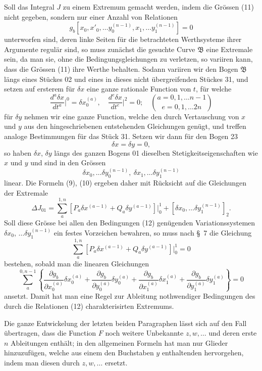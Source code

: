 \documentclass[11pt,a4paper,leqno]{article}
\begin{document}
Soll das Integral $J$ zu einem Extremum gemacht werden, indem die Grössen (11) nicht gegeben, sondern nur einer Anzahl von Relationen
\begin{equation}\tag{12}
g_b[x_0,x'_0,\ldots y_0^{(n-1)},x_1,\ldots y_1^{(n-1)}]=0
\end{equation}
unterworfen sind, deren linke Seiten für die betrachteten Werthsysteme ihrer Argumente regulär sind, so muss zunächst die gesuchte Curve $\mathfrak B$ eine Extremale sein, da man sie, ohne die
Bedingungsgleichungen zu verletzen, so variiren kann, dass die Grössen (11) ihre Werthe behalten. Sodann variiren wir den Bogen $\mathfrak B$ längs eines Stückes 02 und eines in dieses nicht übergreifenden Stückes 31, und setzen auf ersterem für $\delta x$ eine ganze rationale Function von $t$, für welche
\[
\frac{d^a\delta x}{dt^a}\bigg|^0=\delta x_0^{(a)},\quad
\frac{d^e\delta x}{dt^e}\bigg|^2=0;\quad
\binom{a=0,1,\ldots n-1}{e=0,1,\ldots 2n}
\]
für $\delta y$ nehmen wir eine ganze Function, welche den durch Vertauschung von $x$ und $y$ aus den hingeschriebenen entstehenden Gleichungen genügt, und treffen analoge Bestimmungen für das Stück 31. Setzen wir dann für den Bogen 23
\[
\delta x=\delta y=0,
\]
so haben $\delta x$, $\delta y$ längs des ganzen Bogens 01 dieselben Stetigkeitseigenschaften wie $x$ und $y$ und sind in den Grössen
\[
\delta x_0,\ldots \delta y_0^{(n-1)},\ \delta x_1,\ldots \delta y_1^{(n-1)}
\]
linear. Die Formeln (9), (10) ergeben daher mit Rücksicht auf die Gleichungen der Extremale
\[
\Delta J_{01}=\sum_a^{1,n}[P_a\delta x^{(a-1)}+Q_a\delta y^{(a-1)}]\bigg|_0^1
+[\delta x_0,\ldots \delta y_1^{(n-1)}]_2.
\]
Soll diese Grösse bei allen den Bedingungen (12) genügenden Variationssystemen $\delta x_0$, $\ldots\delta y_1^{(n-1)}$ ein festes Vorzeichen bewahren, so muss nach \S~7 die Gleichung
\[
\sum_a^{1,n}[P_a\delta x^{(a-1)}+Q_a\delta y^{(a-1)}]\bigg|_0^1=0
\]
bestehen, sobald man die linearen Gleichungen
\[
\sum_a^{0,n-1}\left\{\frac{\partial g_b}{\partial x_0^{(a)}}\delta x_0^{(a)}+\frac{\partial g_b}{\partial y_0^{(a)}}\delta y_0^{(a)}+\frac{\partial g_b}{\partial x_1^{(a)}}\delta x_1^{(a)}
+\frac{\partial g_b}{\partial y_1^{(a)}}\delta y_1^{(a)}\right\}=0
\]
ansetzt. Damit hat man eine Regel zur Ableitung nothwendiger Bedingungen des durch die Relationen (12) charakterisirten Extremums.

Die ganze Entwickelung der letzten beiden Paragraphen lässt sich auf den Fall übertragen, dass die Function $F$ noch weitere Unbekannte $z,w,\ldots$ und deren erste $n$ Ableitungen enthält; in den allgemeinen Formeln hat man nur Glieder hinzuzufügen,
welche aus einem den Buchstaben $y$ enthaltenden hervorgehen, indem man diesen durch $z,w,\ldots$ ersetzt.
\end{document}
